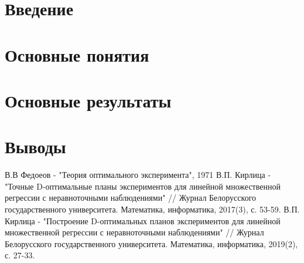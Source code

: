 \documentclass[12pt,a4paper]{article}
\begin{document}


\tableofcontents
\pagebreak

\section{Введение}
	
\pagebreak

\section {Основные понятия}
	
\pagebreak
	
\section{Основные результаты}
	
	
\pagebreak
	
\section{Выводы}
	
\pagebreak
	
\begin{thebibliography}{}
	 В.В Федоеов - "Теория оптимального эксперимента", 1971
	 В.П. Кирлица - "Точные  D-оптимальные планы экспериментов для линейной множественной регрессии с неравноточными наблюдениями" // Журнал Белорусского государственного университета. Математика, информатика, 2017(3), с. 53-59.
	 В.П. Кирлица - "Построение  D-оптимальных  планов экспериментов для линейной множественной регрессии с неравноточными наблюдениями" // Журнал Белорусского государственного университета. Математика, информатика, 2019(2), с. 27-33.
\end{thebibliography}
\end{document}
